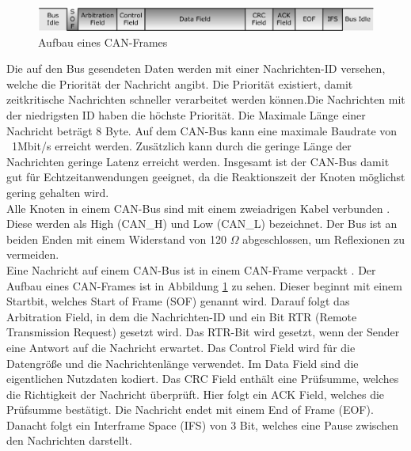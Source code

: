 \begin{figure}[H]
    \centering
    \includegraphics[scale=0.25]{images/canFrame.png}
    \caption{Aufbau eines CAN-Frames \cite{Voss2008}}
    \label{fig:canframe}
\end{figure}

Die auf den Bus gesendeten Daten werden mit einer Nachrichten-ID
versehen, welche die Priorität der Nachricht angibt. Die Priorität existiert, damit zeitkritische Nachrichten
schneller verarbeitet werden können.Die Nachrichten mit der niedrigsten ID haben die höchste Priorität.
Die Maximale Länge einer Nachricht beträgt 8 Byte. 
Auf dem CAN-Bus kann eine maximale Baudrate von \ 1Mbit/s erreicht werden.
Zusätzlich kann durch die geringe Länge der Nachrichten geringe Latenz erreicht werden. 
Insgesamt ist der CAN-Bus damit gut für Echtzeitanwendungen geeignet, da die Reaktionszeit der Knoten möglichst gering gehalten wird.
\\
Alle Knoten in einem CAN-Bus sind mit einem zweiadrigen Kabel verbunden \cite[Seite 132]{Voss2008}. 
Diese werden als High (CAN\_H) und Low (CAN\_L) 
bezeichnet. Der Bus ist an beiden Enden mit einem Widerstand von 120 $\Omega$ abgeschlossen, um Reflexionen zu vermeiden.
\\
Eine Nachricht auf einem CAN-Bus ist in einem CAN-Frame verpackt \cite[Seite 36]{Voss2008}. 
Der Aufbau eines CAN-Frames ist in Abbildung \ref{fig:canframe} zu sehen.
Dieser beginnt mit einem Startbit, welches Start of Frame (SOF) genannt wird. Darauf folgt das Arbitration Field, 
in dem die Nachrichten-ID und ein Bit RTR (Remote Transmission Request) gesetzt wird. Das RTR-Bit wird gesetzt,
wenn der Sender eine Antwort auf die Nachricht erwartet. Das Control Field wird für die Datengröße und die Nachrichtenlänge
verwendet. Im Data Field sind die eigentlichen Nutzdaten kodiert. Das CRC Field enthält eine Prüfsumme, welches die Richtigkeit
der Nachricht überprüft. Hier folgt ein ACK Field, welches die Prüfsumme bestätigt. Die Nachricht endet mit einem End of Frame (EOF).
Danacht folgt ein Interframe Space (IFS) von 3 Bit, welches eine Pause zwischen den Nachrichten darstellt.

